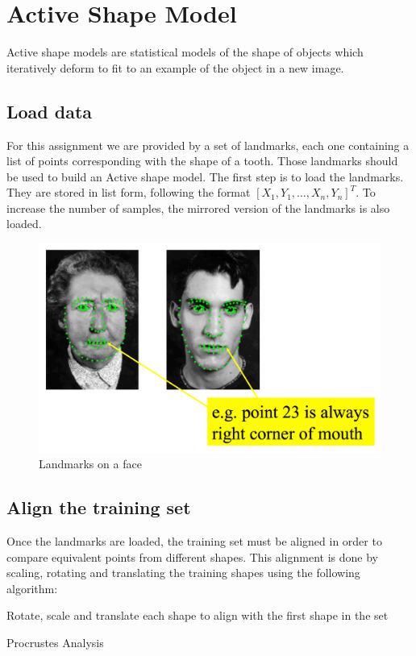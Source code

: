 \section{Active Shape Model}

Active shape models are statistical models of the shape
of objects which iteratively deform to fit to an example
of the object in a new image.

\subsection{Load data}
For this assignment we are provided by a set of landmarks, each one
containing a list of points corresponding with the shape of a tooth.
Those landmarks should be used to build an Active shape model.
The first step is to load the landmarks. They are stored in list form,
following the format ${[X_1, Y_1, \ldots, X_n, Y_n]}^T$. To increase
the number of samples, the mirrored version of the landmarks is also
loaded.

\begin{figure}
  \centering
  \includegraphics[width=0.7\linewidth]{img/landmarks}
  \caption{Landmarks on a face}
\end{figure}


\subsection{Align the training set}
Once the landmarks are loaded, the training set must be aligned in
order to compare equivalent points from different shapes. This
alignment is done by scaling, rotating and translating the training
shapes using the following algorithm:

\begin{algorithm}
\SetAlgoLined 
Rotate, scale and translate each shape to align with the
first shape in the set\;
\caption{Procrustes Analysis}
\end{algorithm}

